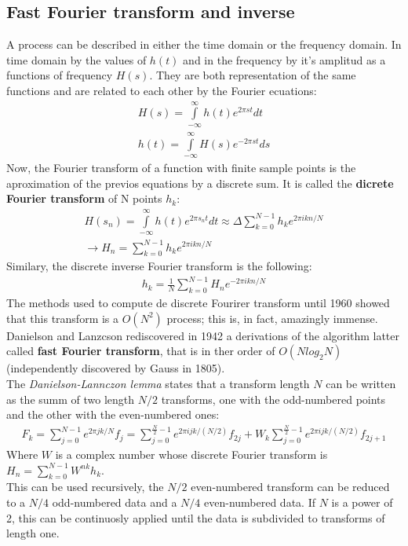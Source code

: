 \documentclass[letterpaper]{article}
\begin{document}
\subsection{Fast Fourier transform and inverse}
A process can be described in either the time domain or the frequency domain. In time domain by the values of $h(t)$ and in the frequency by it's amplitud as a functions of frequency $H(s)$. They are both representation of the same functions and are related to each other by the Fourier ecuations:
\begin{align}
	H(s)= \int\limits_{-\infty}^\infty h(t) e^{2\pi st} dt \\
    h(t)= \int\limits_{-\infty}^\infty H(s) e^{-2\pi st} ds
\end{align}
Now, the Fourier transform of a function with finite sample points is the aproximation of the previos equations by a discrete sum. It is called the \textbf{dicrete Fourier transform} of N points $h_k$:
\begin{align}
	H(s_n)=\int\limits_{-\infty}^\infty h(t) e^{2\pi s_n t} dt \approx \Delta \sum_{k=0}^{N-1} h_k e^{2\pi i k n /N} \\
    \rightarrow H_n=\sum_{k=0}^{N-1} h_k e^{2\pi i k n /N}
\end{align}
Similary, the discrete inverse Fourier transform is the following:
\begin{align}
	h_k= \frac{1}{N} 	\sum_{k=0}^{N-1} H_n e^{-2\pi i k n /N}
\end{align}
The methods used to compute de discrete Fourirer transform until 1960 showed that this transform is a $O(N^2)$ process; this is, in fact, amazingly immense. Danielson and Lanzcson rediscovered in 1942 a derivations of the algorithm latter called \textbf{fast Fourier transform}, that is in ther order of $O(N log_2 N)$ (independently discovered by Gauss in 1805). \\
The \textit{Danielson-Lannczon lemma} states that a transform length $N$ can be written as the summ of two length $N/2$ transforms, one with the odd-numbered points and the other with the even-numbered ones:
\begin{align}
F_k=\sum_{j=0}^{N-1}e^{2\pi jk/N}f_j= \sum_{j=0}^{\frac{N}{2}-1}e^{2\pi ijk/(N/2)}f_{2j}+W_k \sum_{j=0}^{\frac{N}{2}-1}e^{2\pi ijk/(N/2)}f_{2j+1}
\end{align}
Where $W$ is a complex number whose discrete Fourier transform is  $H_n=\sum_{k=0}^{N-1}W^{nk}h_k$.\\ 
This can be used recursively, the $N/2$ even-numbered transform can be reduced to a $N/4$ odd-numbered data and a $N/4$ even-numbered data. If $N$ is a power of 2, this can be continuosly applied until the data is subdivided to transforms of length one.\\ 
\end{document}
